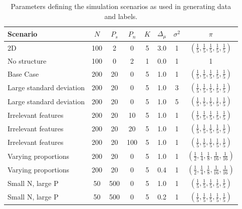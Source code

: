 \documentclass[]{article}
\begin{document}
\begin{table}[ht]
	\centering
	\begin{tabular}{|l|ccccccc|}
	\hline
	\textbf{Scenario} & $N$ & $P_s$ & $P_n$ & $K$ & $\Delta_{\mu}$ & $\sigma^2$ & $\pi$\\
	\hline 
	2D & 100 & 2 & 0 & 5 & 3.0 & 1 &  $(\frac{1}{5} , \frac{1}{5}, \frac{1}{5}, \frac{1}{5}, \frac{1}{5})$ \\
	No structure & 100 & 0 & 2 & 1 & 0.0 & 1 & 1 \\
	Base Case & 200 & 20 & 0 & 5 & 1.0 & 1 &  $(\frac{1}{5} , \frac{1}{5}, \frac{1}{5}, \frac{1}{5}, \frac{1}{5})$\\
	Large standard deviation & 200 & 20 & 0 & 5 & 1.0 & 3 & $(\frac{1}{5} , \frac{1}{5}, \frac{1}{5}, \frac{1}{5}, \frac{1}{5})$ \\
	Large standard deviation & 200 & 20 & 0 & 5 & 1.0 & 5 &  $(\frac{1}{5} , \frac{1}{5}, \frac{1}{5}, \frac{1}{5}, \frac{1}{5})$\\
	Irrelevant features & 200 & 20 & 10 & 5 & 1.0 & 1 &  $(\frac{1}{5} , \frac{1}{5}, \frac{1}{5}, \frac{1}{5}, \frac{1}{5})$\\
	Irrelevant features & 200 & 20 & 20 & 5 & 1.0 & 1 &  $(\frac{1}{5} , \frac{1}{5}, \frac{1}{5}, \frac{1}{5}, \frac{1}{5})$\\
	Irrelevant features & 200 & 20 & 100 & 5 & 1.0 & 1 &  $(\frac{1}{5} , \frac{1}{5}, \frac{1}{5}, \frac{1}{5}, \frac{1}{5})$\\
	Varying proportions & 200 & 20 & 0 & 5 & 1.0 & 1 & $(\frac{1}{2} , \frac{1}{4}, \frac{1}{8}, \frac{1}{16}, \frac{1}{16})$ \\
	Varying proportions & 200 & 20 & 0 & 5 & 0.4 & 1 &  $(\frac{1}{2} , \frac{1}{4}, \frac{1}{8}, \frac{1}{16}, \frac{1}{16})$ \\ %
	Small N, large P & 50 & 500 & 0 & 5 & 1.0 & 1 &  $(\frac{1}{5} , \frac{1}{5}, \frac{1}{5}, \frac{1}{5}, \frac{1}{5})$\\
	Small N, large P & 50 & 500 & 0 & 5 & 0.2 & 1 &  $(\frac{1}{5} , \frac{1}{5}, \frac{1}{5}, \frac{1}{5}, \frac{1}{5})$
	\\
	\hline


	\end{tabular}
	\caption{Parameters defining the simulation scenarios as used in generating data and labels.}
	\label{table:scenarioTable}
\end{table}%
\end{document}
